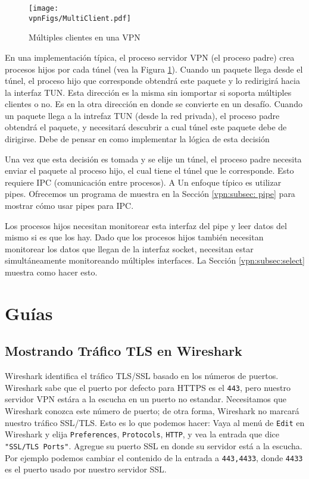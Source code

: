 \begin{figure}[htb]
\begin{center}
\texttt{[image: \\vpnFigs/MultiClient.pdf]}
\end{center}
\caption{Múltiples clientes en una VPN}
\label{vpn:fig:MultiClient}
\end{figure}
 
En una implementación típica, el proceso servidor VPN  (el proceso padre) crea procesos hijos por cada túnel (vea la Figura \ref{vpn:fig:MultiClient}).
Cuando un paquete llega desde el túnel, el proceso hijo que corresponde obtendrá este paquete y lo redirigirá hacia la interfaz TUN.
Esta dirección es la misma sin iomportar si soporta múltiples clientes o no. Es en la otra dirección en donde se convierte en un desafío.
Cuando un paquete llega a la intrefaz TUN (desde la red privada), el proceso padre obtendrá el paquete, y necesitará descubrir a cual túnel este paquete debe de dirigirse. Debe de pensar en como implementar la lógica de esta decisión

Una vez que esta decisión es tomada y se elije un túnel, el proceso padre necesita enviar el paquete al proceso hijo, el cual tiene el túnel que le corresponde. Esto requiere IPC (comunicación entre procesos). A
Un enfoque típico es utilizar pipes. Ofrecemos un programa de muestra en la Sección \ref{vpn:subsec: pipe} para mostrar cómo usar pipes para IPC.

Los procesos hijos necesitan monitorear esta interfaz del pipe y leer datos del mismo si es que los hay. Dado que los procesos hijos también necesitan monitorear los datos que llegan de la interfaz socket, necesitan estar simultáneamente monitoreando múltiples interfaces.
La Sección \ref{vpn:subsec:select} muestra como hacer esto.


\section{Guías}


\subsection{Mostrando Tráfico TLS en Wireshark}

Wireshark identifica el tráfico TLS/SSL basado en los números de puertos. Wireshark sabe que el puerto por defecto para HTTPS es el \texttt{443}, pero nuestro servidor VPN estára a la escucha en un puerto no estandar.
Necesitamos que Wireshark conozca este número de puerto; de otra forma, Wireshark no marcará nuestro tráfico SSL/TLS. Esto es lo que podemos hacer:
Vaya al menú de \texttt{Edit} en Wireshark y elija \texttt{Preferences}, \texttt{Protocols}, \texttt{HTTP}, y vea la entrada que dice \texttt{"SSL/TLS Ports"}. Agregue su puerto SSL en donde su servidor está a la escucha.
Por ejemplo podemos cambiar el contenido de la entrada a \texttt{443,4433}, donde  \texttt{4433} es el puerto usado por nuestro servidor SSL.

